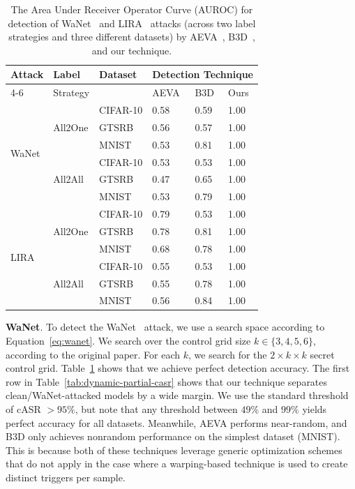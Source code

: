 \documentclass[letterpaper,twocolumn,10pt]{article}
\begin{document}
\begin{table}[h]
\caption{The Area Under Receiver Operator Curve (AUROC) for detection of WaNet~\cite{nguyen2021wanet} and LIRA~\cite{chen2017targeted} attacks (across two label strategies and three different datasets) by AEVA~\cite{guo2021aeva}, B3D~\cite{dong2021black}, and our technique.}
\small
\centering
\begin{tabular}{ll l l l l}
\hline
\multirow{2}{*}{Attack} & Label & \multirow{2}{*}{Dataset} & \multicolumn{3}{c}{Detection Technique} \\ 
\cline{4-6}
 & Strategy & & AEVA & B3D & Ours \\
\hline
\multirow{6}{*}{WaNet}
  & \multirow{3}{*}{All2One} & CIFAR-10 & 0.58 & 0.59 & 1.00 \\
  &                          & GTSRB    & 0.56 & 0.57 & 1.00 \\
  &                          & MNIST    & 0.53 & 0.81 & 1.00 \\
\cline{2-6}
  & \multirow{3}{*}{All2All} & CIFAR-10 & 0.53 & 0.53 & 1.00 \\
  &                          & GTSRB    & 0.47 & 0.65 & 1.00 \\
  &                          & MNIST    & 0.53 & 0.79 & 1.00 \\
\hline
\multirow{6}{*}{LIRA}
  & \multirow{3}{*}{All2One} & CIFAR-10 & 0.79 & 0.53 & 1.00 \\
  &                          & GTSRB    & 0.78 & 0.81 & 1.00 \\
  &                          & MNIST    & 0.68 & 0.78 & 1.00 \\
\cline{2-6}
  & \multirow{3}{*}{All2All} & CIFAR-10 & 0.55 & 0.53 & 1.00 \\
  &                          & GTSRB    & 0.55 & 0.78 & 1.00 \\
  &                          & MNIST    & 0.56 & 0.84 & 1.00 \\
\hline
\end{tabular}

\label{tab:auroc-dynamic}
\end{table}


\textbf{WaNet}. To detect the WaNet~\cite{nguyen2021wanet} attack, we use a search space according to Equation~\ref{eq:wanet}. We search over the control grid size $k \in \{3,4,5,6\}$, according to the original paper. For each $k$, we search for the $2 \times k \times k$ secret control grid. Table~\ref{tab:auroc-dynamic} shows that we achieve perfect detection accuracy. The first row in Table~\ref{tab:dynamic-partial-casr} shows that our technique separates clean/WaNet-attacked models by a wide margin. We use the standard threshold of cASR $>95\%$, but note that any threshold between $49\%$ and $99\%$ yields perfect accuracy for all datasets. Meanwhile, AEVA performs near-random, and B3D only achieves nonrandom performance on the simplest dataset (MNIST). This is because both of these techniques leverage generic optimization schemes that do not apply in the case where a warping-based technique is used to create distinct triggers per sample.
\end{document}
